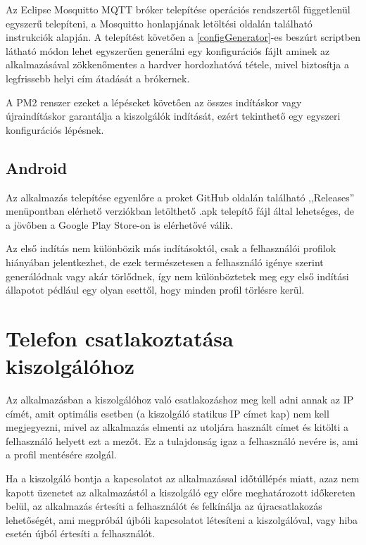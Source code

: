 \documentclass[
]{thesis-ekf}
\theoremstyle{definition}
\theoremstyle{remark}
\begin{document}
Az Eclipse Mosquitto MQTT bróker telepítése operációs rendszertől függetlenül egyszerű telepíteni, a Mosquitto
honlapjának letöltési oldalán található instrukciók alapján. A telepítést követően a \ref{configGenerator}-es
beszúrt scriptben látható módon lehet egyszerűen generálni egy konfigurációs fájlt aminek az alkalmazásával
zökkenőmentes a hardver hordozhatóvá tétele, mivel biztosítja a legfrissebb helyi cím átadását a brókernek.

A PM2 renszer ezeket a lépéseket követően az összes indításkor vagy újraindításkor garantálja a kiszolgálók
indítását, ezért tekinthető egy egyszeri konfigurációs lépésnek.


\subsection{Android}
Az alkalmazás telepítése egyenlőre a proket GitHub oldalán\cite{github}
található ,,Releases'' menüpontban elérhető verziókban letölthető .apk telepítő fájl által lehetséges, de a jövőben
a Google Play Store-on is elérhetővé válik.

Az első indítás nem különbözik más indításoktól, csak a felhasználói profilok hiányában jelentkezhet, de ezek
természetesen a felhasználó igénye szerint generálódnak vagy akár törlődnek, így nem különböztetek meg egy 
első indítási állapotot pédlául egy olyan esettől, hogy minden profil törlésre kerül.

\section{Telefon csatlakoztatása kiszolgálóhoz}
Az alkalmazásban a kiszolgálóhoz való csatlakozáshoz meg kell adni annak az IP címét, amit optimális esetben
(a kiszolgáló statikus IP címet kap) nem kell megjegyezni, mivel az alkalmazás  elmenti az utoljára használt címet
és kitölti a felhasználó helyett ezt a mezőt. Ez a tulajdonság igaz a felhasználó nevére is, ami a profil mentésére
szolgál.

Ha a kiszolgáló bontja a kapcsolatot az alkalmazással időtúllépés miatt, azaz nem kapott üzenetet az alkalmazástól
a kiszolgáló egy előre meghatározott időkereten belül, az alkalmazás értesíti a felhasználót és felkínálja
az újracsatlakozás lehetőségét, ami megpróbál újbóli kapcsolatot létesíteni a kiszolgálóval, vagy hiba esetén
újból értesíti a felhasználót.
\end{document}
